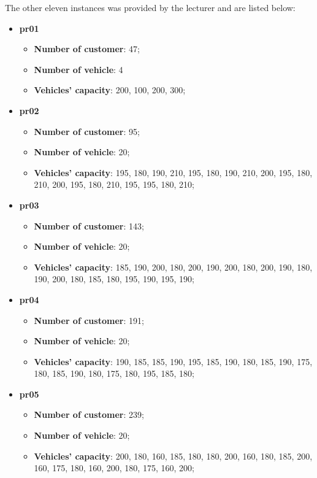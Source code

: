 \documentclass[main.tex]{subfiles}
\begin{document}
The other eleven instances was provided by the lecturer and are listed below:
\begin{itemize}
    \item \textbf{pr01}
        \begin{itemize}
            \item \textbf{Number of customer}: 47;
            \item \textbf{Number of vehicle}: 4
            \item \textbf{Vehicles' capacity}: 200, 100, 200, 300;
        \end{itemize}

    \item \textbf{pr02}
        \begin{itemize}
            \item \textbf{Number of customer}: 95;
            \item \textbf{Number of vehicle}: 20;
            \item \textbf{Vehicles' capacity}: 195, 180, 190, 210, 195, 180, 190, 210, 200, 195, 180, 210, 200, 195, 180, 210, 195, 195, 180, 210;
        \end{itemize}
    
    \item \textbf{pr03}
        \begin{itemize}
            \item \textbf{Number of customer}: 143;
            \item \textbf{Number of vehicle}: 20;
            \item \textbf{Vehicles' capacity}: 185, 190, 200, 180, 200, 190, 200, 180, 200, 190, 180, 190, 200, 180, 185, 180, 195, 190, 195, 190;
        \end{itemize}

    \item \textbf{pr04}
        \begin{itemize}
            \item \textbf{Number of customer}: 191;
            \item \textbf{Number of vehicle}: 20;
            \item \textbf{Vehicles' capacity}: 190, 185, 185, 190, 195, 185, 190, 180, 185, 190, 175, 180, 185, 190, 180, 175, 180, 195, 185, 180;
        \end{itemize}

    \item \textbf{pr05}
        \begin{itemize}
            \item \textbf{Number of customer}: 239;
            \item \textbf{Number of vehicle}: 20;
            \item \textbf{Vehicles' capacity}: 200, 180, 160, 185, 180, 180, 200, 160, 180, 185, 200, 160, 175, 180, 160, 200, 180, 175, 160, 200;
        \end{itemize}


\end{itemize}
\end{document}
